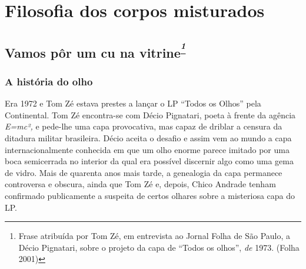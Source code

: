\chapter{Filosofia dos corpos misturados}



\section{Vamos pôr um cu na vitrine\textsuperscript{\emph{\footnote{Frase
  atribuída por Tom Zé, em entrevista ao Jornal Folha de São Paulo, a
  Décio Pignatari, sobre o projeto da capa de ``Todos os olhos'',
  \emph{de }1973. (Folha 2001)}}}}

\subsection{A história do olho}

Era 1972 e Tom Zé estava prestes a lançar o
LP ``Todos os Olhos'' pela Continental. Tom Zé encontra-se com Décio
Pignatari, poeta à frente da agência \emph{E=mc²,} e pede-lhe uma capa
provocativa, mas capaz de driblar a censura da ditadura militar
brasileira. Décio aceita o desafio e assim vem ao mundo a capa
internacionalmente conhecida em que um olho enorme parece imitado por
uma boca semicerrada no interior da qual era possível discernir algo
como uma gema de vidro. Mais de quarenta anos mais tarde, a genealogia
da capa permanece controversa e obscura, ainda que Tom Zé e, depois,
Chico Andrade tenham confirmado publicamente a suspeita de certos
olhares sobre a misteriosa capa do LP.


